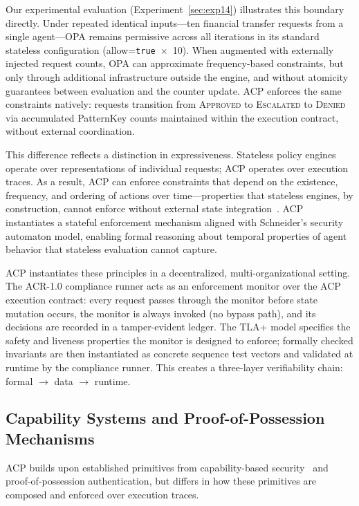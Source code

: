 \documentclass[11pt]{article}
\theoremstyle{definition}
\begin{document}
Our experimental evaluation (Experiment~\ref{sec:exp14}) illustrates this boundary directly.
Under repeated identical inputs---ten financial transfer requests from a single agent---OPA
remains permissive across all iterations in its standard stateless configuration (allow=\texttt{true}~$\times$~10).
When augmented with externally injected request counts, OPA can approximate frequency-based
constraints, but only through additional infrastructure outside the engine, and without
atomicity guarantees between evaluation and the counter update.
ACP enforces the same constraints natively: requests transition from \textsc{Approved} to
\textsc{Escalated} to \textsc{Denied} via accumulated PatternKey counts maintained within
the execution contract, without external coordination.

This difference reflects a distinction in expressiveness.
Stateless policy engines operate over representations of individual requests; ACP operates
over execution traces.
As a result, ACP can enforce constraints that depend on the existence, frequency, and ordering
of actions over time---properties that stateless engines, by construction,
cannot enforce without external state integration~\cite{schneider2000enforceable}.
ACP instantiates a stateful enforcement mechanism aligned with Schneider's security automaton
model, enabling formal reasoning about temporal properties of agent behavior that
stateless evaluation cannot capture.

ACP instantiates these principles in a decentralized, multi-organizational setting.
The ACR-1.0 compliance runner acts as an enforcement monitor over the ACP execution
contract: every request passes through the monitor before state mutation occurs,
the monitor is always invoked (no bypass path), and its decisions are recorded in a
tamper-evident ledger.
The TLA+ model specifies the safety and liveness properties the monitor is designed to
enforce; formally checked invariants are then instantiated as concrete sequence test
vectors and validated at runtime by the compliance runner.
This creates a three-layer verifiability chain: formal $\to$ data $\to$ runtime.

\subsection{Capability Systems and Proof-of-Possession Mechanisms}

ACP builds upon established primitives from capability-based security~\cite{capability-security} and
proof-of-possession authentication, but differs in how these primitives are
composed and enforced over execution traces.
\end{document}
